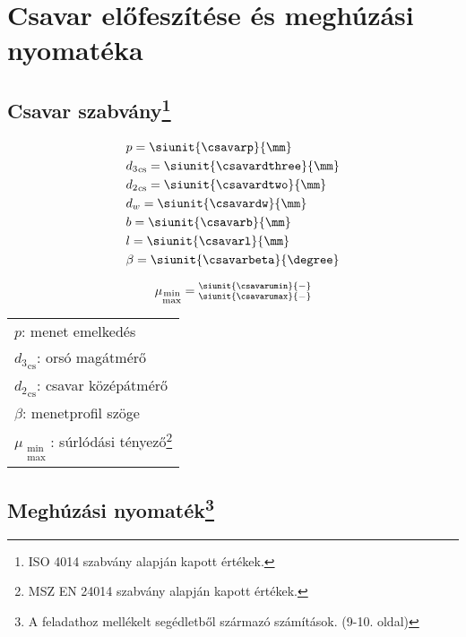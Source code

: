 \section{Csavar előfeszítése és meghúzási nyomatéka}

\subsection[Csavar szabvány]{Csavar szabvány\protect\footnote{ISO 4014 szabvány alapján kapott értékek.}}
\begin{align*}
	& p = \siunit{\csavarp}{\mm} \\
	& {d_3}_\text{cs} = \siunit{\csavardthree}{\mm} \\
	& {d_2}_\text{cs} = \siunit{\csavardtwo}{\mm} \\
	& d_w = \siunit{\csavardw}{\mm} \\
	& b = \siunit{\csavarb}{\mm} \\
	& l = \siunit{\csavarl}{\mm} \\
	& \beta = \siunit{\csavarbeta}{\degree}
\end{align*}

\begin{equation*}
	\mu_{\substack{\text{min}\\\text{max}}}
	= \substack{
		\siunit{\csavarumin}{-} \\
		\siunit{\csavarumax}{-} \\
	}
\end{equation*}

\begin{center}
	\begin{tabular}{l}
		$p$: menet emelkedés \siunit{}{\mm} \\
		${d_3}_\text{cs}$: orsó magátmérő \siunit{}{\mm} \\
		${d_2}_\text{cs}$: csavar középátmérő \siunit{}{\mm} \\
		$\beta$: menetprofil szöge \siunit{}{\degree} \\
		$\mu_{\substack{\text{min}\\\text{max}}}$: súrlódási tényező\footnote{MSZ EN 24014 szabvány alapján kapott értékek.} \siunit{}{-} \\
	\end{tabular}
\end{center}

\newpage
\subsection[Meghúzási nyomaték]{Meghúzási nyomaték\protect\footnote{A feladathoz mellékelt segédletből származó számítások. (9-10. oldal)}}

